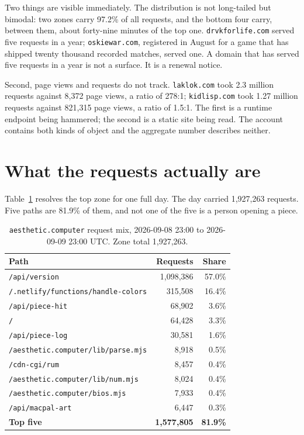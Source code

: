 \documentclass[10pt,letterpaper,twocolumn]{article}
\begin{document}
Two things are visible immediately. The distribution is not long-tailed
but bimodal: two zones carry 97.2\% of all requests, and the bottom four carry,
between them, about forty-nine minutes of the top one.
\texttt{drvkforlife.com} served five requests in a year;
\texttt{oskiewar.com}, registered in August for a game that has shipped
twenty thousand recorded matches, served one. A domain that has served
five requests in a year is not a surface. It is a renewal notice.

Second, page views and requests do not track. \texttt{laklok.com} took
2.3 million requests against 8,372 page views, a ratio of 278:1;
\texttt{kidlisp.com} took 1.27 million requests against 821,315 page
views, a ratio of 1.5:1. The first is a runtime endpoint being
hammered; the second is a static site being read. The account contains
both kinds of object and the aggregate number describes neither.

\section{What the requests actually are}
\label{sec:selftalk}

Table~\ref{tab:mix} resolves the top zone for one full day. The day
carried 1,927,263 requests. Five paths are 81.9\% of them, and not one
of the five is a person opening a piece.

\begin{table}[t]
\centering
\footnotesize
\caption{\texttt{aesthetic.computer} request mix, 2026-09-08 23:00 to 2026-09-09 23:00 UTC. Zone total 1,927,263.}
\label{tab:mix}
\begin{tabularx}{\columnwidth}{@{}X r r@{}}
\toprule
\textbf{Path} & \textbf{Requests} & \textbf{Share} \\
\midrule
\texttt{/api/version}                        & 1,098,386 & 57.0\% \\
\texttt{/.netlify/functions/handle-colors}   &   315,508 & 16.4\% \\
\texttt{/api/piece-hit}                      &    68,902 &  3.6\% \\
\texttt{/}                                   &    64,428 &  3.3\% \\
\texttt{/api/piece-log}                      &    30,581 &  1.6\% \\
\texttt{/aesthetic.computer/lib/parse.mjs}   &     8,918 &  0.5\% \\
\texttt{/cdn-cgi/rum}                        &     8,457 &  0.4\% \\
\texttt{/aesthetic.computer/lib/num.mjs}     &     8,024 &  0.4\% \\
\texttt{/aesthetic.computer/bios.mjs}        &     7,933 &  0.4\% \\
\texttt{/api/macpal-art}                     &     6,447 &  0.3\% \\
\midrule
\textbf{Top five}                            & \textbf{1,577,805} & \textbf{81.9\%} \\
\bottomrule
\end{tabularx}
\end{table}
\end{document}
